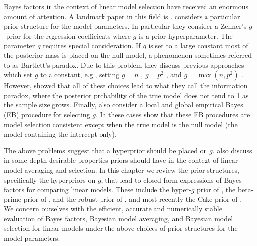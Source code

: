 %	


Bayes factors in the context of linear model selection 
\citep{Zellner1980,
	Zellner1980b,
	Mitchell1988,
	George1993,
	Fernandez2001,
	Liang2008,
	Maruyama2011,
	Bayarri2012}
have received an enormous amount of attention. A landmark paper in this field
is \cite{Liang2008}.  \cite{Liang2008} considers a particular prior structure
for the model parameters.  In particular they consider a Zellner's $g$-prior
\citep{Zellner1980,Zellner1986} for the regression coefficients where $g$ is a
prior hyperparameter. The parameter $g$ requires special consideration. If $g$
is set to a large constant most of the posterior mass is placed on the null
model, a phenomenon sometimes referred to as Bartlett's paradox.  Due to this
problem they discuss previous approaches which set $g$ to a constant, e.g.,
setting $g=n$ \citep{Kass1995b},  $g=p^2$ \citep{Foster1994}, and
$g=\max(n,p^2)$ \citep{Fernandez2001}. However, \cite{Liang2008} showed that
all of these choices lead to what they call the information paradox, where the
posterior probability of the true model does not tend to 1 as the sample size
grows. Finally, \cite{Liang2008} also consider a local and global empirical
Bayes (EB) procedure for selecting $g$. In these cases \cite{Liang2008} show
that these EB procedures are model selection consistent except when the true
model is the null model (the model containing the intercept only). 


The above problems suggest that a hyperprior should be placed on $g$.
\cite{Bayarri2012} also discuss in some depth desirable properties priors
should have in the context of linear model averaging and selection.  In this
chapter we review the prior structures, specifically the hyperpriors on $g$,
that lead to closed form expressions of Bayes factors for comparing linear
models.  These include the hyper-$g$ prior of \cite{Liang2008}, the beta-prime
prior of \cite{Maruyama2011}, and the robust prior of \cite{Bayarri2012}, and
most recently the Cake prior of \cite{OrmerodEtal2017}.
We concern ourselves with the efficient, accurate and numerically stable
evaluation of Bayes factors, Bayesian model averaging, and Bayesian model
selection  for linear models under the above choices of prior structures for
the model parameters.


